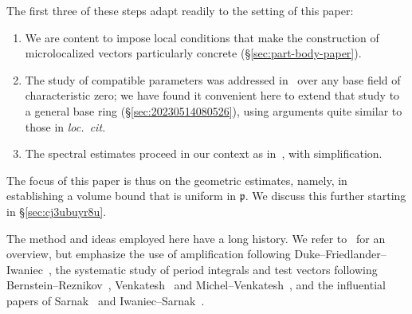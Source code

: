 \documentclass[reqno]{amsart}
\theoremstyle{plain} \newtheorem{theorem} {Theorem} \newtheorem{conjecture} {Conjecture} \newtheorem{corollary} [theorem] {Corollary} \newtheorem{proposition} [theorem] {Proposition} \newtheorem{fact} [theorem] {Fact}
\theoremstyle{definition} \newtheorem{definition} [theorem] {Definition}
\theoremstyle{itplain} %
\begin{document}
The first three of these steps adapt readily to the setting of this paper:
\begin{enumerate}
\item We are content to impose local conditions that make the construction of microlocalized vectors particularly concrete (\S\ref{sec:part-body-paper}). 
\item The study of compatible parameters was addressed in~\cite[\S13-14]{nelson-venkatesh-1} over any base field of characteristic zero; we have found it convenient here to extend that study to a general base ring (\S\ref{sec:20230514080526}), using arguments quite similar to those in \emph{loc.\ cit.}
\item The spectral estimates proceed in our context as in~\cite[\S18]{nelson-venkatesh-1}, with simplification.
\end{enumerate}
The focus of this paper is thus on the geometric estimates, namely, in establishing a volume bound that is uniform in $\mathfrak{p}$.  We discuss this further starting in \S\ref{sec:cj3ubuyr8u}.

\begin{remark}
The method and ideas employed here have a long history.  We refer to~\cite[\S2.6]{2020arXiv201202187N} for an overview, but emphasize the use of amplification following Duke--Friedlander--Iwaniec~\cite{MR1942691, DFI94, MR1923476}, the systematic study of period integrals and test vectors following Bernstein--Reznikov~\cite{MR2726097}, Venkatesh~\cite{venkatesh-2005} and Michel--Venkatesh~\cite{michel-2009}, and the influential papers of Sarnak~\cite{MR780071} and Iwaniec--Sarnak~\cite{iwan-sar}.
\end{remark}
\end{document}
